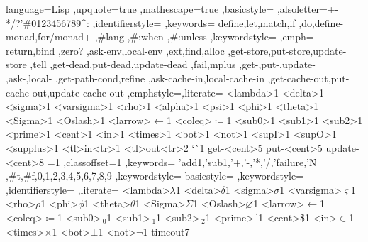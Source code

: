 \usepackage{listings}
\lstset%
  {language=Lisp
  ,upquote=true
  ,mathescape=true
  ,basicstyle=\ttfamily\color{PuncColor}
  ,alsoletter=+-*/?'\#0123456789^:
  ,identifierstyle=\color{IdentifierColor}
  ,keywords=
    {define,let,match,if
    ,do,define-monad,for/monad+
    ,\#lang
    ,\#:when
    ,\#:unless
    }
  ,keywordstyle=\color{KeywordColor}
  ,emph=
    {return,bind
    ,zero?
    ,ask-env,local-env
    ,ext,find,alloc
    ,get-store,put-store,update-store
    ,tell
    ,get-dead,put-dead,update-dead
    ,fail,mplus
    ,get-,put-,update-
    ,ask-,local-
    ,get-path-cond,refine
    ,ask-cache-in,local-cache-in
    ,get-cache-out,put-cache-out,update-cache-out
    }
  ,emphstyle=\color{IdentifierColor}\emph
  ,literate=
    {<lambda>}{{{\KY{$\lambda$}}}}1
    {<delta>}{{{\ID{$\delta$}}}}1
    {<sigma>}{{{\ID{$\sigma$}}}}1
    {<varsigma>}{{{\ID{$\varsigma$}}}}1
    {<rho>}{{{\ID{$\rho$}}}}1
    {<alpha>}{{{\ID{$\alpha$}}}}1
    {<psi>}{{{\ID{$\psi$}}}}1
    {<phi>}{{{\ID{$\phi$}}}}1
    {<theta>}{{{\ID{$\theta$}}}}1
    {<Sigma>}{{{\ssmall\ID{$\Sigma $}}}}1
    {<Oslash>}{{{\ID{$\varnothing $}}}}1
    {<larrow>}{{{\scriptsize$\leftarrow $}}}1
    {<coleq>}{{{\scriptsize$\coloneqq $}}}1
    {<sub0>}{{{}}}1
    {<sub1>}{{{}}}1
    {<sub2>}{{{}}}1
    {<prime>}{{{\ID{$\,^{\prime} $}}}}1
    {<cent>}{{{\ID{\$}}}}1
    {<in>}{{{\ID{$\in $}}}}1
    {<times>}{{{\ssmall\ID{$\times $}}}}1
    {<bot>}{{{\ssmall\ID{$\bot $}}}}1
    {<not>}{{{\ssmall\ID{$\neg $}}}}1
    {<supI>}{{{}}}1
    {<supO>}{{{}}}1
    {<supplus>}{{{\ID{\,$^{\text{+}}$}}}}1
    {<tl>in<tr>}{{{}}}1
    {<tl>out<tr>}{{{}}}2
    {`}{{{\`{}}}}1
    {get-<cent>}{{{}}}5
    {put-<cent>}{{{}}}5
    {update-<cent>}{{{}}}8
    {=}{{{\ID{=}}}}1
  ,classoffset=1
  ,keywords=
    {'add1,'sub1,'+,'-,'*,'/,'failure,'N
    ,\#t,\#f,0,1,2,3,4,5,6,7,8,9
    }
  ,keywordstyle=\color{ValueColor}
  }
  {basicstyle=\ttfamily\color{ResultColor}
  ,keywordstyle=\color{ResultColor}
  ,identifierstyle=\color{ResultColor}
  ,literate=
    {<lambda>}{{{$\lambda$}}}1
    {<delta>}{{{$\delta$}}}1
    {<sigma>}{{{$\sigma$}}}1
    {<varsigma>}{{{$\varsigma$}}}1
    {<rho>}{{{$\rho$}}}1
    {<phi>}{{{$\phi$}}}1
    {<theta>}{{{$\theta$}}}1
    {<Sigma>}{{{\ssmall$\Sigma $}}}1
    {<Oslash>}{{{$\varnothing $}}}1
    {<larrow>}{{{$\leftarrow $}}}1
    {<coleq>}{{{$\coloneqq $}}}1
    {<sub0>}{{{$\,_{\text{0}}$}}}1
    {<sub1>}{{{$\,_{\text{1}}$}}}1
    {<sub2>}{{{$\,_{\text{2}}$}}}1
    {<prime>}{{{$\,^{\prime} $}}}1
    {<cent>}{{{\$}}}1
    {<in>}{{{$\in $}}}1
    {<times>}{{{\ssmall$\times $}}}1
    {<bot>}{{{\ssmall$\bot $}}}1
    {<not>}{{{\ssmall$\neg $}}}1
    {timeout}{{{}}}7
  }

